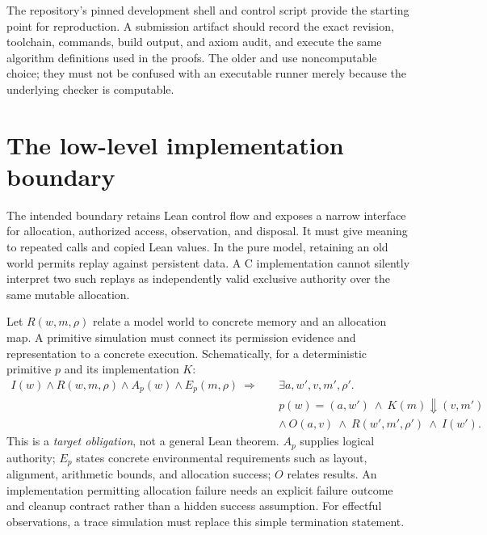 \documentclass[a4paper,UKenglish,cleveref]{lipics-v2021}
\begin{document}
The repository's pinned development shell and control script provide the
starting point for reproduction. A submission artifact should record the exact
revision, toolchain, commands, build output, and axiom audit, and execute the
same algorithm definitions used in the proofs. The older
 and  use noncomputable
choice; they must not be confused with an executable runner merely because the
underlying checker is computable.

\section{The low-level implementation boundary}
\label{sec:boundary}

The intended boundary retains Lean control flow and exposes a narrow interface
for allocation, authorized access, observation, and disposal. It must give
meaning to repeated calls and copied Lean values. In the pure model, retaining
an old world permits replay against persistent data. A C implementation cannot
silently interpret two such replays as independently valid exclusive authority
over the same mutable allocation.

Let $R(w,m,\rho)$ relate a model world to concrete memory and an allocation map.
A primitive simulation must connect its permission evidence and representation
to a concrete execution. Schematically, for a deterministic primitive $p$ and
its implementation $K$:
\[
\begin{split}
 I(w)\land R(w,m,\rho)\land A_p(w)\land E_p(m,\rho)
 \ \Longrightarrow\quad &\exists a,w',v,m',\rho'.\\
 &p(w)=(a,w')\ \land\ K(m)\Downarrow(v,m')\\
 &\land\ O(a,v)\ \land\ R(w',m',\rho')\ \land\ I(w').
\end{split}
\]
This is a \emph{target obligation}, not a general Lean theorem. $A_p$ supplies
logical authority; $E_p$ states concrete environmental requirements such as
layout, alignment, arithmetic bounds, and allocation success; $O$ relates
results. An implementation permitting allocation failure needs an explicit
failure outcome and cleanup contract rather than a hidden success assumption.
For effectful observations, a trace simulation must replace this simple
termination statement.
\end{document}
